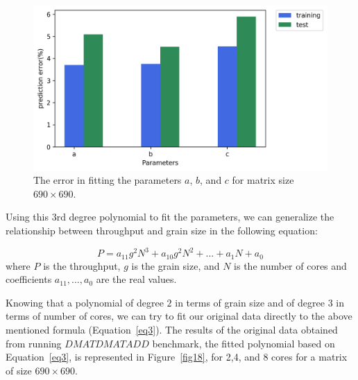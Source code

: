 \vspace{\baselineskip}	
\begin{figure}[H]
	\centering
	\includegraphics[scale=.45]{images/polyfit/fig_690_params_error.png}
	
	\caption{The error in fitting the parameters $a$, $b$, and $c$ for matrix size $690\times690$.}	
	\label{fig16}
\end{figure}

Using this $3$rd degree polynomial to fit the parameters, we can generalize the relationship between throughput and grain size in the following equation:

\begin{equation}\label{eq3}
P=a_{11}g^2N^3+a_{10}g^2N^2+...+a_1N+a_0
\end{equation}
where $P$ is the throughput, $g$ is the grain size, and $N$ is the number of cores and coefficients $a_{11},...,a_0$ are the real values.

Knowing that a polynomial of degree $2$ in terms of grain size and of degree $3$ in terms of number of cores, we can try to fit our original data directly to the above mentioned formula (Equation~\ref{eq3}). The results of the original data obtained from running $DMATDMATADD$ benchmark, the fitted polynomial based on Equation~\ref{eq3}, is represented in Figure~\ref{fig18}, for 2,4, and 8 cores for a matrix of size $690\times690$.

